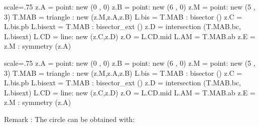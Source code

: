 \begin{tkzelements}
scale=.75
   z.A  = point: new (0 , 0)
   z.B  = point: new (6 , 0)
   z.M  = point: new (5 , 3)
   T.MAB    = triangle : new (z.M,z.A,z.B)
   L.bis    = T.MAB : bisector ()
   z.C  = L.bis.pb
   L.bisext = T.MAB : bisector_ext ()
   z.D  = intersection (T.MAB.bc, L.bisext)
   L.CD = line: new (z.C,z.D)
   z.O  = L.CD.mid
   L.AM = T.MAB.ab
   z.E  = z.M : symmetry (z.A)
\end{tkzelements}

\hspace*{\fill}  
\hspace*{\fill}

\begin{tkzexample}[latex=0cm,small,code only]
\begin{tkzelements}
scale=.75
   z.A      = point: new (0 , 0)
   z.B      = point: new (6 , 0)
   z.M      = point: new (5 , 3)
   T.MAB    = triangle : new (z.M,z.A,z.B)
   L.bis    = T.MAB : bisector ()
   z.C      = L.bis.pb
   L.bisext = T.MAB : bisector_ext ()
   z.D      = intersection (T.MAB.bc, L.bisext)
   L.CD     = line: new (z.C,z.D)
   z.O      = L.CD.mid
   L.AM     = T.MAB.ab
   z.E      = z.M : symmetry (z.A)
\end{tkzelements}
\end{tkzexample}

Remark : The circle can be obtained with:

